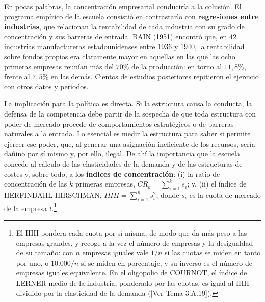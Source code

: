 \documentclass[10pt,a4paper]{article}
\newcommand{\authorfont}[1]{{\fontfamily{EBGaramond-TLF}\selectfont #1}}
\begin{document}
En pocas palabras, la concentración empresarial conduciría a la colusión. El programa empírico de la escuela consistió en contrastarlo con \textbf{regresiones entre industrias}, que relacionan la rentabilidad de cada industria con su grado de concentración y sus barreras de entrada. BAIN (1951) encontró que, en $42$ industrias manufactureras estadounidenses entre 1936 y 1940, la rentabilidad sobre fondos propios era claramente mayor en aquellas en las que las ocho primeras empresas reunían más del $70\%$ de la producción: en torno al $11,8\%$, frente al $7,5\%$ en las demás. Cientos de estudios posteriores repitieron el ejercicio con otros datos y periodos.

La implicación para la política es directa. Si la estructura causa la conducta, la defensa de la competencia debe partir de la sospecha de que toda estructura con poder de mercado procede de comportamientos estratégicos o de barreras naturales a la entrada. Lo esencial es medir la estructura para saber si permite ejercer ese poder, que, al generar una asignación ineficiente de los recursos, sería dañino por sí mismo y, por ello, ilegal. De ahí la importancia que la escuela concede al cálculo de las elasticidades de la demanda y de las estructuras de costes y, sobre todo, a los \textbf{índices de concentración}: (i) la ratio de concentración de las $k$ primeras empresas, $CR_k=\sum_{i=1}^{k}s_i$; y, (ii) el índice de HERFINDAHL-HIRSCHMAN, $IHH=\sum_{i=1}^{n}s_i^2$, donde $s_i$ es la cuota de mercado de la empresa $i$.\footnote{%
    El IHH pondera cada cuota por sí misma, de modo que da más peso a las empresas grandes, y recoge a la vez el número de empresas y la desigualdad de su tamaño: con $n$ empresas iguales vale $1/n$ si las cuotas se miden en tanto por uno, o $10{.}000/n$ si se miden en porcentaje, y su inverso es el número de empresas iguales equivalente. En el oligopolio de COURNOT, el índice de LERNER medio de la industria, ponderado por las cuotas, es igual al IHH dividido por la elasticidad de la demanda ([\authorfont{Ver Tema 3.A.19}]).
}
\end{document}
